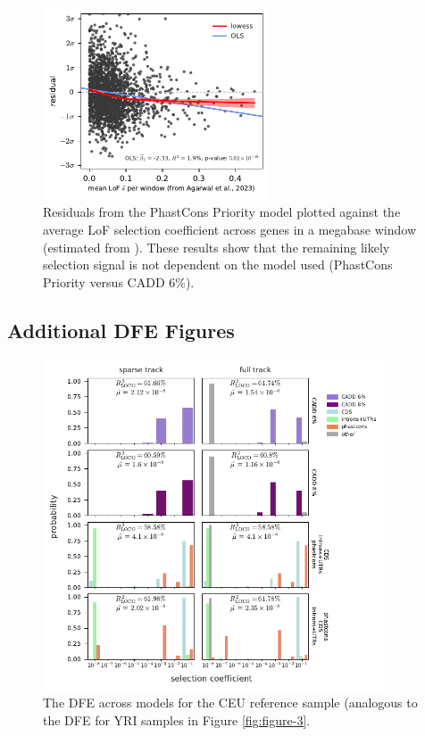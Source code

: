 \documentclass[11pt]{article}
\begin{document}
\begin{figure}[htbp]
  \label{suppfig:resid-pc-fit}
  \centering
  \includegraphics[width=0.6\textwidth]{figures/supplementary/phastcons_resid_lof.pdf}
  \caption{Residuals from the PhastCons Priority model plotted against the
  average LoF selection coefficient across genes in a megabase window
(estimated from \cite{Agarwal2023-un}). These results show that the remaining likely 
selection signal is not dependent on the model used (PhastCons Priority versus CADD 6\%).}
\end{figure}

\subsection{Additional DFE Figures}

\begin{figure}[htbp]
  \label{suppfig:dfe-ceu}
  \centering
  \includegraphics[width=0.9\textwidth]{figures/supplementary/figure_ceu_dfe.pdf}
  \caption{The DFE across models for the CEU reference sample (analogous to the
  DFE for YRI samples in Figure \ref{fig:figure-3}.}
\end{figure}
\end{document}
